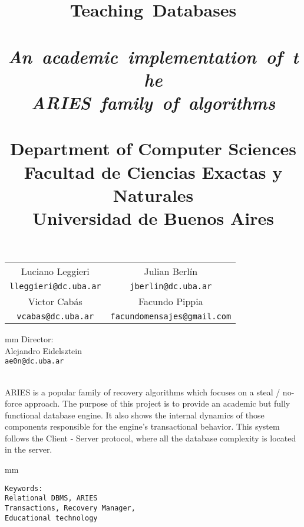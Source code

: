 \title{
	\mbox{\Huge Teaching Databases}\\
	\mbox{}\\
	\mbox{\it An academic implementation of the}\\
	\mbox{\it ARIES family of algorithms}\\
	\mbox{}\\
	Department of Computer Sciences \\
	Facultad de Ciencias Exactas y Naturales\\
	Universidad de Buenos Aires
\date{}
}
\author{}

\maketitle

\begin{center}
	\begin{tabular}{cc}
		Luciano Leggieri&Julian Berl\'in\\
		{\small \verb"lleggieri@dc.uba.ar"}&{\small \verb"jberlin@dc.uba.ar"}\\
		\cr
		Victor Cab\'as&Facundo Pippia\\
		{\small \verb"vcabas@dc.uba.ar"}&{\small \verb"facundomensajes@gmail.com"}\\
	\end{tabular}
	 mm
	Director:\\
	Alejandro Eidelsztein\\
	{\small \verb"ae0n@dc.uba.ar"}\\
\end{center}

{\\}
ARIES is a popular family of recovery algorithms which focuses on a steal / no-force approach. The purpose of this project is to provide an academic but fully functional database engine. It also shows the internal dynamics of those components responsible for the engine's transactional behavior.
This system follows the Client - Server protocol, where all the database complexity is located in the server.

 mm
\begin{center}
	\texttt{Keywords: \\Relational DBMS, ARIES \\Transactions, Recovery Manager,\\Educational technology}
\end{center}

